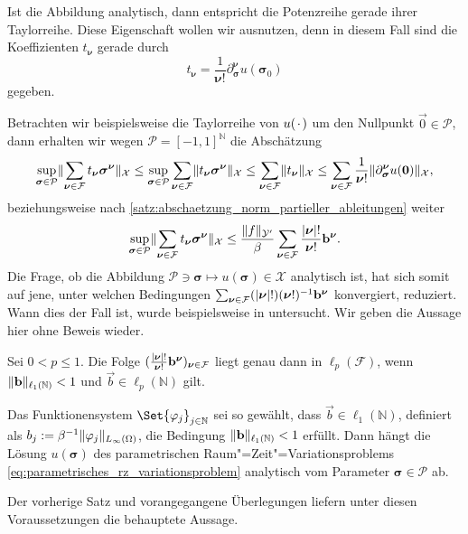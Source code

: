 Ist die Abbildung analytisch, dann entspricht die Potenzreihe gerade ihrer Taylorreihe.
Diese Eigenschaft wollen wir ausnutzen, denn in diesem Fall sind die Koeffizienten $t_{\bm \nu}$ gerade durch
\begin{equation}
    t_{\bm \nu} = \frac{1}{\bm\nu!} \partial^{\bm \nu}_{\bm \sigma} u(\bm \sigma_{0})
\end{equation}
gegeben.

Betrachten wir beispielsweise die Taylorreihe von $u({\mkern2mu\cdot\mkern2mu})$ um den Nullpunkt $\vec 0 \in \mathcal P$, dann erhalten wir wegen $\mathcal P = [-1, 1]^{\mathbb{N}}$ die Abschätzung
\begin{equation}
    \sup_{\bm\sigma \in \mathcal P} \lVert\sum_{\bm\nu \in \mathcal F} t_{\bm\nu} \bm\sigma^{\bm\nu}\rVert_{\mathcal X}
    \leq \sup_{\bm\sigma \in \mathcal P} \sum_{\bm\nu \in \mathcal F} \lVert t_{\bm\nu} \bm\sigma^{\bm\nu}\rVert_{\mathcal X}
    \leq \sum_{\bm\nu \in \mathcal F} \lVert t_{\bm\nu}\rVert_{\mathcal X}
    \leq \sum_{\bm \nu \in \mathcal F} \frac{1}{\bm\nu!} \lVert \partial^{\bm \nu}_{\bm \sigma} u(\mathbf{0})\rVert_{\mathcal X},
\end{equation}
beziehungsweise nach \cref{satz:abschaetzung_norm_partieller_ableitungen} weiter
\begin{equation}
    \sup_{\bm\sigma \in \mathcal P} \lVert\sum_{\bm\nu \in \mathcal F} t_{\bm\nu} \bm\sigma^{\bm\nu}\rVert_{\mathcal X}
    \leq \frac{\lVert f\rVert_{\mathcal Y'}}{\beta} \sum_{\bm \nu \in \mathcal F} \frac{\lvert\bm\nu\rvert!}{\bm\nu!} \mathbf{b}^{\bm\nu}.
\end{equation}
Die Frage, ob die Abbildung $\mathcal P \ni \bm \sigma \mapsto u(\bm \sigma) \in \mathcal X$ analytisch ist, hat sich somit auf jene, unter welchen Bedingungen $\sum_{\bm \nu \in \mathcal F} (\lvert\bm\nu\rvert!)(\bm\nu!)^{-1} \mathbf{b}^{\bm\nu}$ konvergiert, reduziert.
Wann dies der Fall ist, wurde beispielsweise in \cite[Theorem 7.2]{Cohen:2010kz} untersucht.
Wir geben die Aussage hier ohne Beweis wieder.

\begin{Satz}
\label{satz:cohen2010kz:theorem72}
    Sei $0 < p \leq 1$.
    Die Folge $(\frac{\lvert\bm\nu\rvert!}{\bm\nu!} \mathbf{b}^{\bm\nu})_{\bm\nu \in \mathcal F}$ liegt genau dann in $\ell_{p}(\mathcal F)$, wenn $\lVert\mathbf{b}\rVert_{\ell_{1}(\mathbb{N})} < 1$ und $\vec b \in \ell_{p}(\mathbb{N})$ gilt.
\end{Satz}

\begin{Satz}
\label{satz:loesungen_analytisch}
    Das Funktionensystem $\Set{\varphi_{j}}_{j \in \mathbb{N}}$ sei so gewählt, dass $\vec b \in \ell_{1}(\mathbb{N})$, definiert als $b_{j} := \beta^{-1} \lVert\varphi_{j}\rVert_{L_{\infty}(\Omega)}$, die Bedingung $\lVert\mathbf{b}\rVert_{\ell_{1}(\mathbb{N})} < 1$ erfüllt.
    Dann hängt die Lösung $u(\bm \sigma)$ des parametrischen Raum"=Zeit"=Variationsproblems \cref{eq:parametrisches_rz_variationsproblem} analytisch vom Parameter $\bm \sigma \in \mathcal P$ ab.

    \begin{Beweis}
        Der vorherige Satz und vorangegangene Überlegungen liefern unter diesen Voraussetzungen die behauptete Aussage.
    \end{Beweis}
\end{Satz}

